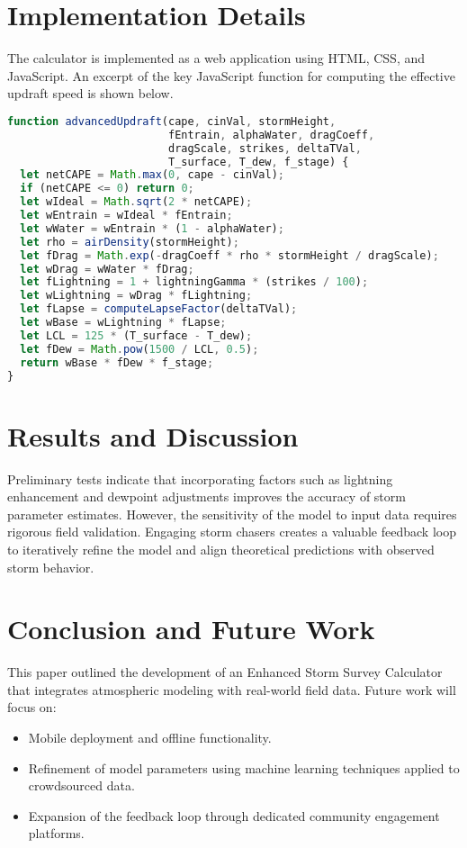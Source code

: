 \documentclass[12pt]{article}
\begin{document}
\section{Implementation Details}

The calculator is implemented as a web application using HTML, CSS, and JavaScript. An excerpt of the key JavaScript function for computing the effective updraft speed is shown below.

\begin{lstlisting}[language=JavaScript, caption=Key JavaScript Function for Updraft Calculation]
function advancedUpdraft(cape, cinVal, stormHeight,
                         fEntrain, alphaWater, dragCoeff,
                         dragScale, strikes, deltaTVal,
                         T_surface, T_dew, f_stage) {
  let netCAPE = Math.max(0, cape - cinVal);
  if (netCAPE <= 0) return 0;
  let wIdeal = Math.sqrt(2 * netCAPE);
  let wEntrain = wIdeal * fEntrain;
  let wWater = wEntrain * (1 - alphaWater);
  let rho = airDensity(stormHeight);
  let fDrag = Math.exp(-dragCoeff * rho * stormHeight / dragScale);
  let wDrag = wWater * fDrag;
  let fLightning = 1 + lightningGamma * (strikes / 100);
  let wLightning = wDrag * fLightning;
  let fLapse = computeLapseFactor(deltaTVal);
  let wBase = wLightning * fLapse;
  let LCL = 125 * (T_surface - T_dew);
  let fDew = Math.pow(1500 / LCL, 0.5);
  return wBase * fDew * f_stage;
}
\end{lstlisting}

\section{Results and Discussion}

Preliminary tests indicate that incorporating factors such as lightning enhancement and dewpoint adjustments improves the accuracy of storm parameter estimates. However, the sensitivity of the model to input data requires rigorous field validation. Engaging storm chasers creates a valuable feedback loop to iteratively refine the model and align theoretical predictions with observed storm behavior.

\section{Conclusion and Future Work}

This paper outlined the development of an Enhanced Storm Survey Calculator that integrates atmospheric modeling with real-world field data. Future work will focus on:
\begin{itemize}
  \item Mobile deployment and offline functionality.
  \item Refinement of model parameters using machine learning techniques applied to crowdsourced data.
  \item Expansion of the feedback loop through dedicated community engagement platforms.
\end{itemize}
\end{document}
